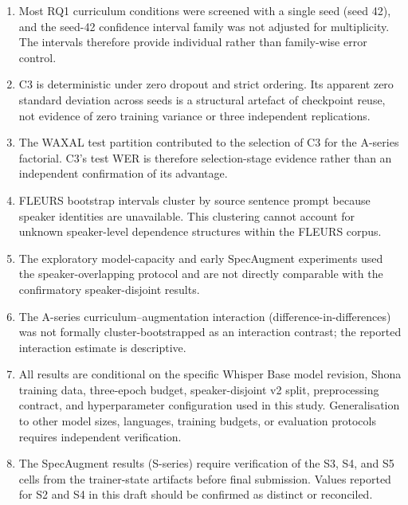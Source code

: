 \begin{enumerate}
    \item Most RQ1 curriculum conditions were screened with a single seed (seed
    42), and the seed-42 confidence interval family was not adjusted for
    multiplicity. The intervals therefore provide individual rather than
    family-wise error control.
    
    \item C3 is deterministic under zero dropout and strict ordering. Its
    apparent zero standard deviation across seeds is a structural artefact of
    checkpoint reuse, not evidence of zero training variance or three independent
    replications.
    
    \item The WAXAL test partition contributed to the selection of C3 for the
    A-series factorial. C3's test WER is therefore selection-stage evidence
    rather than an independent confirmation of its advantage.
    
    \item FLEURS bootstrap intervals cluster by source sentence prompt because
    speaker identities are unavailable. This clustering cannot account for
    unknown speaker-level dependence structures within the FLEURS corpus.
    
    \item The exploratory model-capacity and early SpecAugment experiments used
    the speaker-overlapping protocol and are not directly comparable with the
    confirmatory speaker-disjoint results.
    
    \item The A-series curriculum--augmentation interaction
    (difference-in-differences) was not formally cluster-bootstrapped as an
    interaction contrast; the reported interaction estimate is descriptive.
    
    \item All results are conditional on the specific Whisper Base model
    revision, Shona training data, three-epoch budget, speaker-disjoint v2
    split, preprocessing contract, and hyperparameter configuration used in this
    study. Generalisation to other model sizes, languages, training budgets, or
    evaluation protocols requires independent verification.
    
    \item The SpecAugment results (S-series) require verification of the S3, S4,
    and S5 cells from the trainer-state artifacts before final submission.
    Values reported for S2 and S4 in this draft should be confirmed as distinct
    or reconciled.
\end{enumerate}



